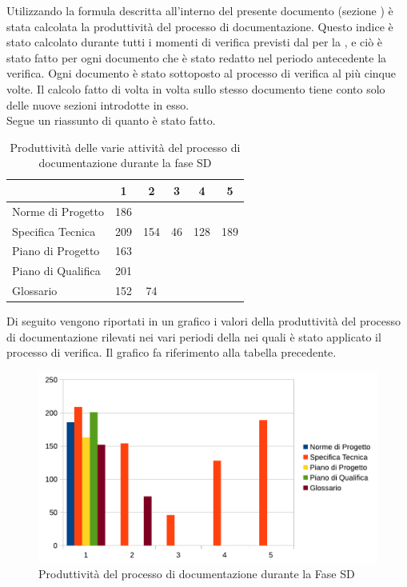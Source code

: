 			Utilizzando la formula descritta all'interno del presente documento (sezione ) è stata calcolata la produttività del processo di documentazione. Questo indice è stato calcolato durante tutti i momenti di verifica previsti dal  per	la , e ciò è stato fatto per ogni documento che è stato redatto nel periodo antecedente la verifica. Ogni documento è stato sottoposto al processo di verifica al più cinque volte. Il calcolo fatto di volta in volta sullo stesso documento tiene conto solo delle nuove sezioni introdotte in esso.\\
				Segue un riassunto di quanto è stato fatto.
				\begin{table}[H]
					\centering
					\begin{tabu}{| l | c | c | c | c | c |}
						\hline
							&1	&2	&3	&4	&5	\\ \hline
						Norme di Progetto	& 186 &	&	&	& \\ \hline
						Specifica Tecnica &	209 & 154 & 46	&	128 & 189 \\ \hline
						Piano di Progetto	& 163 &	&	&	& \\ \hline
						Piano di Qualifica	& 201	&	&	&	&\\ \hline
						Glossario & 152 & 74 & & &\\ \hline
					\end{tabu}
					\caption{Produttività delle varie attività del processo di documentazione durante la fase SD}
				\end{table}
				Di seguito vengono riportati in un grafico i valori della produttività del processo di documentazione rilevati nei vari periodi della  nei quali è stato applicato il processo di verifica. Il grafico fa riferimento alla tabella precedente.\\
				\begin{figure}[H]
					\centering
					\includegraphics[width=12cm]{PianoDiQualifica/Pics/ProduttivitaDocumentazioneFaseSD.pdf}
					\caption{Produttività del processo di documentazione durante la Fase SD}
				\end{figure}
